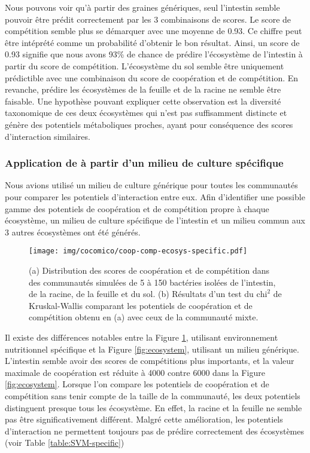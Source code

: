 \documentclass[../main.tex]{subfiles}
\begin{document}
Nous pouvons voir qu'à partir des graines génériques, seul l'intestin semble pouvoir être prédit correctement par les 3 combinaisons de scores. Le score de compétition semble plus se démarquer avec une moyenne de 0.93. Ce chiffre peut être intéprété comme un probabilité d'obtenir le bon résultat. Ainsi, un score de 0.93 signifie que nous avons 93\% de chance de prédire l'écosystème de l'intestin à partir du score de compétition. L'écosystème du sol semble être uniquement prédictible avec une combinaison du score de coopération et de compétition. En revanche, prédire les écosystèmes de la feuille et de la racine ne semble être faisable. Une hypothèse pouvant expliquer cette observation est la diversité taxonomique de ces deux écosystèmes qui n'est pas suffisamment distincte et génère des potentiels métaboliques proches, ayant pour conséquence des scores d'interaction similaires.


\subsubsection*{Application de \ccmc à partir d'un milieu de culture spécifique}
Nous avions utilisé un milieu de culture générique pour toutes les communautés pour comparer les potentiels d'interaction entre eux. Afin d'identifier une possible gamme des potentiels de coopération et de compétition propre à chaque écosystème, un milieu de culture spécifique de l'intestin et un milieu commun aux 3 autres écosystèmes ont été générés. 

\begin{figure}[H]
    \centering
    \texttt{[image: img/cocomico/coop-comp-ecosys-specific.pdf]}
    \caption{(a) Distribution des scores de coopération et de compétition dans des communautés simulées de 5 à 150 bactéries isolées de l'intestin, de la racine, de la feuille et du sol. (b) Résultats d'un test du $\text{chi}^2$ de Kruskal-Wallis comparant les potentiels de coopération et de compétition obtenu en (a) avec ceux de la communauté mixte. }
    \label{fig:ecosystem-specific}
\end{figure}

Il existe des différences notables entre la Figure \ref{fig:ecosystem-specific}, utilisant environnement nutritionnel spécifique et la Figure \ref{fig:ecosystem}, utilisant un milieu générique. L'intestin semble avoir des scores de compétitions plus importants, et la valeur maximale de coopération est réduite à 4000 contre 6000 dans la Figure \ref{fig:ecosystem}. Lorsque l'on compare les potentiels de coopération et de compétition sans tenir compte de la taille de la communauté, les deux potentiels distinguent presque tous les écosystème. En effet, la racine et la feuille ne semble pas être significativement différent. Malgré cette amélioration, les potentiels d'interaction ne permettent toujours pas de prédire correctement des écosystèmes (voir Table \ref{table:SVM-specific})\\
\end{document}
